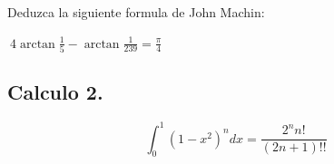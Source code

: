 \documentclass{article}
\theoremstyle{mytheoremstyle}
\theoremstyle{mytheoremstyle}
\theoremstyle{myproblemstyle}
\begin{document}
\begin{problem}

Deduzca la siguiente formula de John Machin:

\begin{center}

    $\displaystyle\ 4\arctan{\frac{1}{5}} - \arctan{\frac{1}{239}} = \frac{\pi}{4}  $

\end{center}


\end{problem}

\newpage


\subsection{Calculo 2.}

\begin{problem}


\[\int_{0}^{1}(1-x^2)^n dx = \frac{2^{n}{n!}}{(2n+1)!!}\]

\end{problem}
\end{document}

